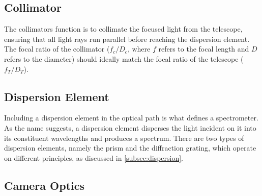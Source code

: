 \subsection{Collimator}

The collimators function is to collimate the focused light from the telescope, ensuring that all light rays run parallel before reaching the dispersion element. The focal ratio of the collimator ($f_{c} / D_{c}$, where $f$ refers to the focal length and $D$ refers to the diameter) should ideally match the focal ratio of the telescope ($f_{T} / D_{T}$).





\subsection{Dispersion Element}

Including a dispersion element in the optical path is what defines a spectrometer. As the name suggests, a dispersion element disperses the light incident on it into its constituent wavelengths and produces a spectrum. There are two types of dispersion elements, namely the prism and the diffraction grating, which operate on different principles, as discussed in \autoref{subsec:dispersion}.

\subsection{Camera Optics}

